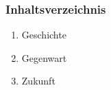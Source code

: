 \begin{frame}[plain]
\frametitle{Inhaltsverzeichnis}
\begin{enumerate}
\item Geschichte
\item Gegenwart
\item Zukunft
\end{enumerate}
\end{frame}
